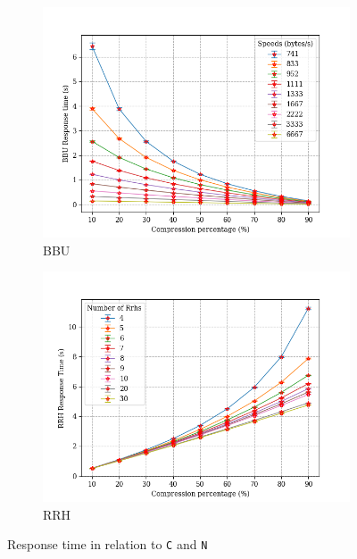 \documentclass[11pt,a4paper,oneside, openright]{article}
\begin{document}
\begin{figure}[H]
  \centering
  \begin{subfigure}{.5\textwidth}
  	\centering
  	\includegraphics[width=\linewidth]{images/c-vs-response-time-bbu}
  	\caption{BBU}
  	\label{fig:c-vs-response-time-bbu}
  \end{subfigure}%
  \begin{subfigure}{.5\textwidth}
    \centering
    \includegraphics[width=\linewidth]{images/c-vs-response-time-rrh}
    \caption{RRH}
    \label{fig:c-vs-response-time-rrh}
  \end{subfigure}
  \caption{Response time in relation to \texttt{C} and \texttt{N}}
  \label{fig:response-time}
\end{figure}
\end{document}
